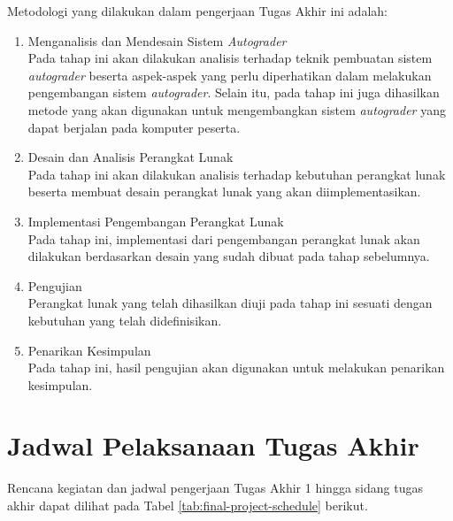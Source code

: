 \par Metodologi yang dilakukan dalam pengerjaan Tugas Akhir ini adalah:
\begin{enumerate}
	\item Menganalisis dan Mendesain Sistem \textit{Autograder} \\ Pada tahap ini akan dilakukan analisis terhadap teknik pembuatan sistem \textit{autograder} beserta aspek-aspek yang perlu diperhatikan dalam melakukan pengembangan sistem \textit{autograder}. Selain itu, pada tahap ini juga dihasilkan metode yang akan digunakan untuk mengembangkan sistem \textit{autograder} yang dapat berjalan pada komputer peserta.
	\item Desain dan Analisis Perangkat Lunak \\ Pada tahap ini akan dilakukan analisis terhadap kebutuhan perangkat lunak beserta membuat desain perangkat lunak yang akan diimplementasikan.
	\item Implementasi Pengembangan Perangkat Lunak \\ Pada tahap ini, implementasi dari pengembangan perangkat lunak akan dilakukan berdasarkan desain yang sudah dibuat pada tahap sebelumnya.
	\item Pengujian \\ Perangkat lunak yang telah dihasilkan diuji pada tahap ini sesuati dengan kebutuhan yang telah didefinisikan.
	\item Penarikan Kesimpulan \\ Pada tahap ini, hasil pengujian akan digunakan untuk melakukan penarikan kesimpulan.
\end{enumerate}

\section{Jadwal Pelaksanaan Tugas Akhir}

\par Rencana kegiatan dan jadwal pengerjaan Tugas Akhir 1 hingga sidang tugas akhir dapat dilihat pada Tabel \ref{tab:final-project-schedule} berikut.

